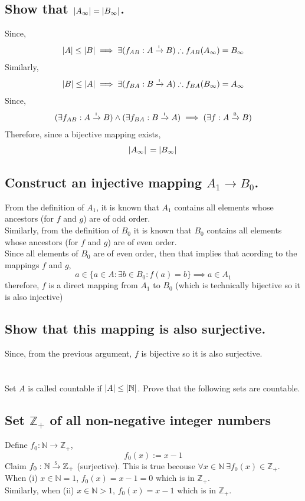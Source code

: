\documentclass[]{article}
\newcommand{\N}{\mathbb{N}}
\newcommand{\Z}{\mathbb{Z}}
\newcommand{\toI}{\xrightarrow{\textsf{\tiny I}}}
\newcommand{\toS}{\xrightarrow{\textsf{\tiny S}}}
\newcommand{\toB}{\xrightarrow{\textsf{\tiny B}}}
\begin{document}
\subsection{Show that $\abs{A_\infty}=\abs{B_\infty}$.}

Since,
$$\abs{A} \leq \abs{B} \implies \exists (f_{AB} : A \toI B) \therefore f_{AB}(A_\infty) = B_\infty$$
Similarly,
$$\abs{B} \leq \abs{A} \implies \exists (f_{BA} : B \toI A) \therefore f_{BA}(B_\infty) = A_\infty$$
Since,
$$(\exists f_{AB} : A \toI B) \land (\exists f_{BA} : B \toI A) 
\implies (\exists f : A \toB B)$$
Therefore, since a bijective mapping exists,
$$\abs*{A_\infty} = \abs*{B_\infty}$$

\subsection{Construct an injective mapping $A_1 \rightarrow B_0$.}

From the definition of $A_1$,
it is known that $A_1$ contains all elements whose ancestors (for $f$ and $g$) are of odd order.\\
Similarly, from the definition of $B_0$ it is known that $B_0$ contains all elements whose 
ancestors (for $f$ and $g$) are of even order.\\
Since all elements of $B_0$ are of even order, then that implies that acording to the mappings
$f$ and $g$, $$a \in \{a \in A : \exists b \in B_0 : f(a) = b\} \implies a \in A_1$$
therefore, $f$ is a direct mapping from $A_1$ to $B_0$ 
(which is technically bijective so it is also injective)

\subsection{Show that this mapping is also surjective.}
Since, from the previous argument, $f$ is bijective so it is also surjective.



%
%
% 
% 
% 
% 
% 
% 
% 





\newpage
\section{}
Set $A$ is called countable if $\abs{A} \leq \abs{\N}$.
Prove that the following sets are countable.

\subsection{Set $\Z_+$ of all non-negative integer numbers}
Define $f_0 : \N \to \Z_+$, 
\begin{displaymath}
	f_0(x) := x - 1
\end{displaymath}
Claim $f_0 : \N \toS \Z_+$ (surjective).
This is true becouse $\forall x \in \N \ \exists f_0(x) \in \Z_+$.\\
When (i) $x \in \N = 1$, $f_0(x) = x - 1 = 0$ which is in $\Z_+$.\\
Similarly, when (ii) $x \in \N > 1$, $f_0(x) = x - 1$ which is in $\Z_+$.\\
\end{document}
